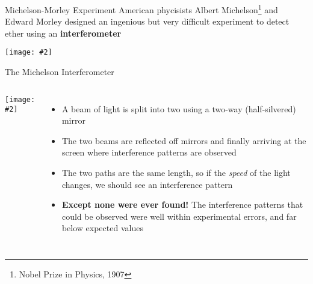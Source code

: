 \documentclass[12pt,compress,aspectratio=169]{beamer}
\newcommand{\pic}[2]{\texttt{[image: \#2]}}
\begin{document}
\begin{frame}{Michelson-Morley Experiment}
  American phycisists Albert Michelson\footnote{Nobel Prize in Physics, 1907}
  and Edward Morley designed an ingenious but very difficult experiment to
  detect ether using an \textbf{interferometer}
  \begin{center}
    \pic{.8}{graphics/michelsonmorley.jpg}
  \end{center}
\end{frame}



\begin{frame}{The Michelson Interferometer}
  \begin{columns}
    \begin{center}
      \pic{1.1}{graphics/313754.jpg}
    \end{center}

    \begin{itemize}
    \item A beam of light is split into two using a two-way (half-silvered)
      mirror
    \item The two beams are reflected off mirrors and finally arriving at the
      screen where interference patterns are observed
    \item The two paths are the same length, so if the \emph{speed} of the light
      changes, we should see an interference pattern
    \item\textbf{Except none were ever found!} The interference patterns that
      could be observed were well within experimental errors, and far below
      expected values
    \end{itemize}
  \end{columns}
\end{frame}
\end{document}
